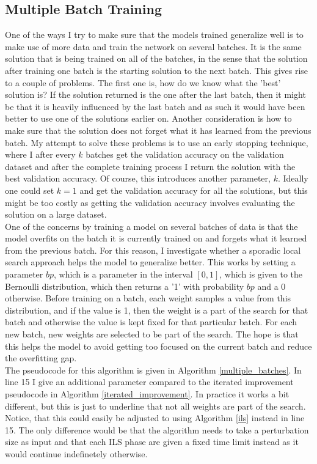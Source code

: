 \subsection{Multiple Batch Training}

One of the ways I try to make sure that the models trained generalize well is to make use of more data and train the network on several batches. It is the same solution that is being trained on all of the batches, in the sense that the solution after training one batch is the starting solution to the next batch. This gives rise to a couple of problems. The first one is, how do we know what the 'best' solution is? If the solution returned is the one after the last batch, then it might be that it is heavily influenced by the last batch and as such it would have been better to use one of the solutions earlier on. Another consideration is how to make sure that the solution does not forget what it has learned from the previous batch. My attempt to solve these problems is to use an early stopping technique, where I after every $k$ batches get the validation accuracy on the validation dataset and after the complete training process I return the solution with the best validation accuracy. Of course, this introduces another parameter, $k$. Ideally one could set $k=1$ and get the validation accuracy for all the solutions, but this might be too costly as getting the validation accuracy involves evaluating the solution on a large dataset. \\

\noindent One of the concerns by training a model on several batches of data is that the model overfits on the batch it is currently trained on and forgets what it learned from the previous batch. For this reason, I investigate whether a sporadic local search approach helps the model to generalize better. This works by setting a parameter $bp$, which is a parameter in the interval $[0,1]$, which is given to the Bernoulli distribution, which then returns a '1' with probability $bp$ and a 0 otherwise. Before training on a batch, each weight samples a value from this distribution, and if the value is 1, then the weight is a part of the search for that batch and otherwise the value is kept fixed for that particular batch. For each new batch, new weights are selected to be part of the search. The hope is that this helps the model to avoid getting too focused on the current batch and reduce the overfitting gap. \\

\noindent The pseudocode for this algorithm is given in Algorithm \ref{multiple_batches}. In line 15 I give an additional parameter compared to the iterated improvement pseudocode in Algorithm \ref{iterated_improvement}. In practice it works a bit different, but this is just to underline that not all weights are part of the search. Notice, that this could easily be adjusted to using Algorithm \ref{ils} instead in line 15. The only difference would be that the algorithm needs to take a perturbation size as input and that each ILS phase are given a fixed time limit instead as it would continue indefinetely otherwise. 

